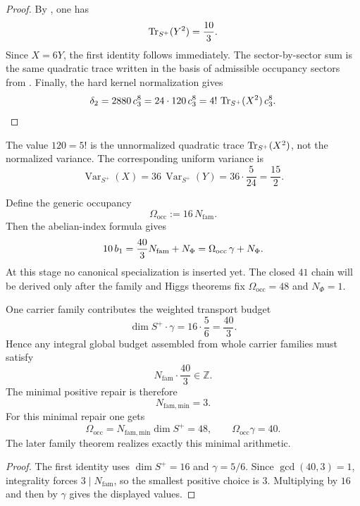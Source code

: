 \begin{proof}
By , one has
\[
\operatorname{Tr}_{S^+}(Y^2)=\frac{10}{3}.
\]
Since $X=6Y$, the first identity follows immediately. The sector-by-sector sum is the same quadratic trace written in the basis of admissible occupancy sectors from . Finally, the hard kernel normalization gives
\[
\delta_2=2880\,c_3^8=24\cdot 120\,c_3^8
=
4!\,\operatorname{Tr}_{S^+}(X^2)\,c_3^8.
\]
\end{proof}

\begin{remark}
The value $120=5!$ is the unnormalized quadratic trace $\operatorname{Tr}_{S^+}(X^2)$, not the normalized variance. The corresponding uniform variance is
\[
\operatorname{Var}_{S^+}(X)=36\,\operatorname{Var}_{S^+}(Y)=36\cdot\frac{5}{24}=\frac{15}{2}.
\]
\end{remark}

\begin{remark}
Define the generic occupancy
\[
\Omega_{\mathrm{occ}}:=16\,N_{\mathrm{fam}}.
\]
Then the abelian-index formula gives
\[
10\,b_1
=
\frac{40}{3}N_{\mathrm{fam}}+N_\Phi
=
\Omega_{\mathrm{occ}}\,\gamma+N_\Phi.
\]
At this stage no canonical specialization is inserted yet. The closed $41$ chain will be derived
only after the family and Higgs theorems fix $\Omega_{\mathrm{occ}}=48$ and $N_\Phi=1$.
\end{remark}

\begin{corollary}
\label{cor:family-integrality-repair}
One carrier family contributes the weighted transport budget
\[
\dim S^+\cdot\gamma
=
16\cdot\frac56
=
\frac{40}{3}.
\]
Hence any integral global budget assembled from whole carrier families must satisfy
\[
N_{\mathrm{fam}}\cdot \frac{40}{3}\in\mathbb Z.
\]
The minimal positive repair is therefore
\[
N_{\mathrm{fam,min}}=3.
\]
For this minimal repair one gets
\[
\Omega_{\mathrm{occ}}=N_{\mathrm{fam,min}}\dim S^+=48,
\qquad
\Omega_{\mathrm{occ}}\gamma=40.
\]
The later family theorem realizes exactly this minimal arithmetic.
\end{corollary}

\begin{proof}
The first identity uses $\dim S^+=16$ and $\gamma=5/6$. Since $\gcd(40,3)=1$, integrality forces
$3\mid N_{\mathrm{fam}}$, so the smallest positive choice is $3$. Multiplying by $16$ and then by
$\gamma$ gives the displayed values.
\end{proof}

